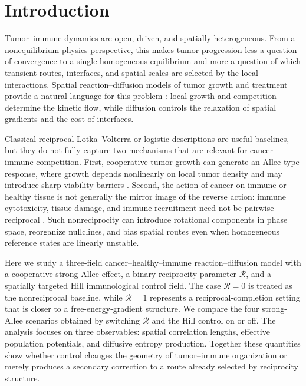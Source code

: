 \section{Introduction}

Tumor--immune dynamics are open, driven, and spatially heterogeneous. From a nonequilibrium-physics perspective, this makes tumor progression less a question of convergence to a single homogeneous equilibrium and more a question of which transient routes, interfaces, and spatial scales are selected by the local interactions. Spatial reaction--diffusion models of tumor growth and treatment provide a natural language for this problem \cite{murray2002,enderling2014,chaplain2006}: local growth and competition determine the kinetic flow, while diffusion controls the relaxation of spatial gradients and the cost of interfaces.

Classical reciprocal Lotka--Volterra or logistic descriptions are useful baselines, but they do not fully capture two mechanisms that are relevant for cancer--immune competition. First, cooperative tumor growth can generate an Allee-type response, where growth depends nonlinearly on local tumor density and may introduce sharp viability barriers \cite{gerlee2022,bottger2015}. Second, the action of cancer on immune or healthy tissue is not generally the mirror image of the reverse action: immune cytotoxicity, tissue damage, and immune recruitment need not be pairwise reciprocal \cite{delitala2007,gatenby2004,fruchart2021}. Such nonreciprocity can introduce rotational components in phase space, reorganize nullclines, and bias spatial routes even when homogeneous reference states are linearly unstable.

Here we study a three-field cancer--healthy--immune reaction--diffusion model with a cooperative strong Allee effect, a binary reciprocity parameter $\mathcal{R}$, and a spatially targeted Hill immunological control field. The case $\mathcal{R}=0$ is treated as the nonreciprocal baseline, while $\mathcal{R}=1$ represents a reciprocal-completion setting that is closer to a free-energy-gradient structure. We compare the four strong-Allee scenarios obtained by switching $\mathcal{R}$ and the Hill control on or off. The analysis focuses on three observables: spatial correlation lengths, effective population potentials, and diffusive entropy production. Together these quantities show whether control changes the geometry of tumor--immune organization or merely produces a secondary correction to a route already selected by reciprocity structure.
